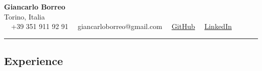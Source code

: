 \documentclass[11pt,letterpaper]{article}
\begin{document}
\begin{center}
	{\LARGE \textbf{Giancarlo Borreo}}\\
	Torino, Italia
	\vspace{0.02cm}
	\\
	\raisebox{-0.2\height}{{\small \faPhoneSquare}} \ \  +39 351 911 92 91 \hfill
	\raisebox{-0.2\height}{{\small \faEnvelopeSquare}} \ \ giancarloborreo@gmail.com \hfill
	\raisebox{-0.2\height}{{\small \faGithubSquare}} \ \
	\href{https://github.com/deadman20018/}{GitHub} \hfill
	\raisebox{-0.2\height}{{\small \faLinkedinSquare}} \ \
	\href{https://www.linkedin.com/in/giancarlo-borreo-8b79101a0/}{LinkedIn}
\end{center}

\hrule
\vspace{-1em}
\subsection*{\Large Experience}
\end{document}
